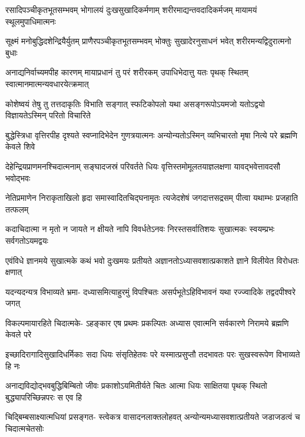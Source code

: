 \fourlineindentedshloka
{रसादिपञ्चीकृतभूतसम्भवम्}
{भोगालयं दुःखसुखादिकर्मणाम्}
{शरीरमाद्यन्तवदादिकर्मजम्}
{मायामयं स्थूलमुपाधिमात्मनः} %

\fourlineindentedshloka
{सूक्ष्मं मनोबुद्धिदशेन्द्रियैर्युतम्}
{प्राणैरपञ्चीकृतभूतसम्भवम्}
{भोक्तुः सुखादेरनुसाधनं भवेत्}
{शरीरमन्यद्विदुरात्मनो बुधाः} %

\fourlineindentedshloka
{अनाद्यनिर्वाच्यमपीह कारणम्}
{मायाप्रधानं तु परं शरीरकम्}
{उपाधिभेदात्तु यतः पृथक् स्थितम्}
{स्वात्मानमात्मन्यवधारयेत्क्रमात्} %

\fourlineindentedshloka
{कोशेष्वयं तेषु तु तत्तदाकृतिः}
{विभाति सङ्गात् स्फटिकोपलो यथा}
{असङ्गरूपोऽयमजो यतोऽद्वयो}
{विज्ञायतेऽस्मिन् परितो विचारिते} %

\fourlineindentedshloka
{बुद्धेस्त्रिधा वृत्तिरपीह दृश्यते}
{स्वप्नादिभेदेन गुणत्रयात्मनः}
{अन्योन्यतोऽस्मिन् व्यभिचारतो मृषा}
{नित्ये परे ब्रह्मणि केवले शिवे} %

\fourlineindentedshloka
{देहेन्द्रियप्राणमनश्चिदात्मनाम्}
{सङ्घादजस्रं परिवर्तते धियः}
{वृत्तिस्तमोमूलतयाज्ञलक्षणा}
{यावद्भवेत्तावदसौ भवोद्भवः} %

\fourlineindentedshloka
{नेतिप्रमाणेन निराकृताखिलो}
{हृदा समास्वादितचिद्घनामृतः}
{त्यजेदशेषं जगदात्तसद्रसम्}
{पीत्वा यथाम्भः प्रजहाति तत्फलम्} %

\fourlineindentedshloka
{कदाचिदात्मा न मृतो न जायते}
{न क्षीयते नापि विवर्धतेऽनवः}
{निरस्तसर्वातिशयः सुखात्मकः}
{स्वयम्प्रभः सर्वगतोऽयमद्वयः} %

\fourlineindentedshloka
{एवंविधे ज्ञानमये सुखात्मके}
{कथं भवो दुःखमयः प्रतीयते}
{अज्ञानतोऽध्यासवशात्प्रकाशते}
{ज्ञाने विलीयेत विरोधतः क्षणात्} %

\fourlineindentedshloka
{यदन्यदन्यत्र विभाव्यते भ्रमा-}
{दध्यासमित्याहुरमुं विपश्चितः}
{असर्पभूतेऽहिविभावनं यथा}
{रज्ज्वादिके तद्वदपीश्वरे जगत्} %

\fourlineindentedshloka
{विकल्पमायारहिते चिदात्मके-}
{ऽहङ्कार एष प्रथमः प्रकल्पितः}
{अध्यास एवात्मनि सर्वकारणे}
{निरामये ब्रह्मणि केवले परे} %

\fourlineindentedshloka
{इच्छादिरागादिसुखादिधर्मिकाः}
{सदा धियः संसृतिहेतवः परे}
{यस्मात्प्रसुप्तौ तदभावतः परः}
{सुखस्वरूपेण विभाव्यते हि नः} %

\fourlineindentedshloka
{अनाद्यविद्योद्भवबुद्धिबिम्बितो}
{जीवः प्रकाशोऽयमितीर्यते चितः}
{आत्मा धियः साक्षितया पृथक् स्थितो}
{बुद्ध्यापरिच्छिन्नपरः स एव हि} %

\fourlineindentedshloka
{चिद्बिम्बसाक्ष्यात्मधियां प्रसङ्गत-}
{स्त्वेकत्र वासादनलाक्तलोहवत्}
{अन्योन्यमध्यासवशात्प्रतीयते}
{जडाजडत्वं च चिदात्मचेतसोः} %

